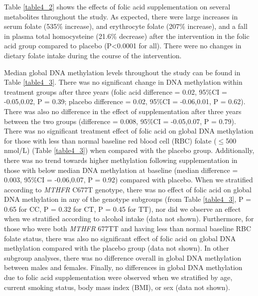 \noindent Table \ref{table4_2} shows the effects of folic acid supplementation on several metabolites throughout the study. As expected, there were large increases in serum folate (535\% increase), and erythrocyte folate (207\% increase), and a fall in plasma total homocysteine (21.6\% decrease) after the intervention in the folic acid group compared to placebo (P<0.0001 for all). There were no changes in dietary folate intake during the course of the intervention.

\noindent Median global DNA methylation levels throughout the study can be found in Table \ref{table4_3}. There was no significant change in DNA methylation within treatment groups after three years (folic acid difference = 0.02, 95\%CI = -0.05,0.02, P = 0.39; placebo difference = 0.02, 95\%CI = -0.06,0.01, P = 0.62). There was also no difference in the effect of supplementation after three years between the two groups (difference = 0.008, 95\%CI = -0.05,0.07, P = 0.79). There was no significant treatment effect of folic acid on global DNA methylation for those with less than normal baseline red blood cell (RBC) folate ($\leq$500 nmol/L) (Table \ref{table4_3}) when compared with the placebo group. Additionally, there was no trend towards higher methylation following supplementation in those with below median DNA methylation at baseline (median difference = 0.003, 95\%CI = -0.06,0.07, P = 0.92) compared with placebo. When we stratified according to \emph{MTHFR} C677T genotype, there was no effect of folic acid on global DNA methylation in any of the genotype subgroups (from Table \ref{table4_3}, P = 0.65 for CC, P = 0.32 for CT, P = 0.45 for TT), nor did we observe an effect when we stratified according to alcohol intake (data not shown). Furthermore, for those who were both \emph{MTHFR} 677TT and having less than normal baseline RBC folate status, there was also no significant effect of folic acid on global DNA methylation compared with the placebo group (data not shown). In other subgroup analyses, there was no difference overall in global DNA methylation between males and females. Finally, no differences in global DNA methylation due to folic acid supplementation were observed when we stratified by age, current smoking status, body mass index (BMI), or sex (data not shown).



